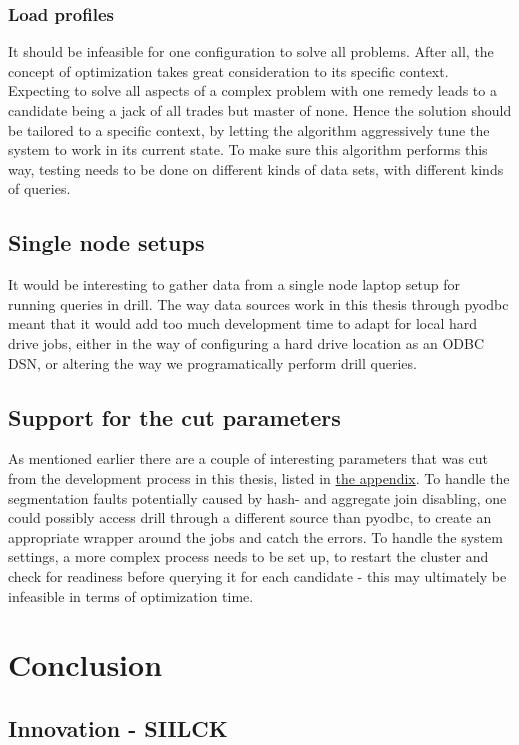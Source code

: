 \documentclass[a4paper,english]{report}
\begin{document}
	\subsection{Load profiles}
	It should be infeasible for one configuration to solve all problems. After all, the concept of optimization takes great consideration to its specific context. Expecting to solve all aspects of a complex problem with one remedy leads to a candidate being a jack of all trades but master of none. Hence the solution should be tailored to a specific context, by letting the algorithm aggressively tune the system to work in its current state. To make sure this algorithm performs this way, testing needs to be done on different kinds of data sets, with different kinds of queries.
	\section{Single node setups}
	It would be interesting to gather data from a single node laptop setup for running queries in drill. The way data sources work in this thesis through pyodbc meant that it would add too much development time to adapt for local hard drive jobs, either in the way of configuring a hard drive location as an ODBC DSN, or altering the way we programatically perform drill queries. 
	\pagebreak
	\section{Support for the cut parameters}
	As mentioned earlier there are a couple of interesting parameters that was cut from the development process in this thesis, listed in \hyperref[table:removed_params]{the appendix}. To handle the segmentation faults potentially caused by hash- and aggregate join disabling, one could possibly access drill through a different source than pyodbc, to create an appropriate wrapper around the jobs and catch the errors. To handle the system settings, a more complex process needs to be set up, to restart the cluster and check for readiness before querying it for each candidate - this may ultimately be infeasible in terms of optimization time.
	
	\chapter{Conclusion}
	\section{Innovation - SIILCK}
\end{document}
